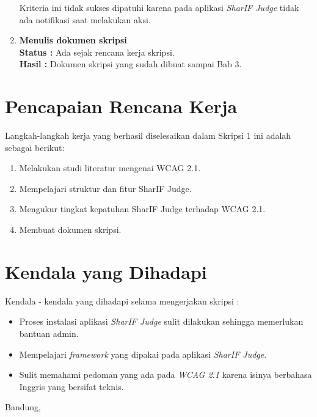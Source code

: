 \documentclass[a4paper,twoside]{article}
\begin{document}
\begin{enumerate}
		Kriteria ini tidak sukses dipatuhi karena pada aplikasi \textit{SharIF Judge} tidak ada notifikasi saat melakukan aksi.

		\item \textbf{Menulis dokumen skripsi}\\
		{\bf Status :} Ada sejak rencana kerja skripsi.\\
		{\bf Hasil :} Dokumen skripsi yang sudah dibuat sampai Bab 3.

	\end{enumerate}

\section{Pencapaian Rencana Kerja}
Langkah-langkah kerja yang berhasil diselesaikan dalam Skripsi 1 ini adalah sebagai berikut:
\begin{enumerate}
\item Melakukan studi literatur mengenai WCAG 2.1.
\item Mempelajari struktur dan fitur SharIF Judge.
\item Mengukur tingkat kepatuhan SharIF Judge terhadap WCAG 2.1.
\item Membuat dokumen skripsi.
\end{enumerate}



\section{Kendala yang Dihadapi}
Kendala - kendala yang dihadapi selama mengerjakan skripsi :
\begin{itemize}
	\item Proses instalasi aplikasi \textit{SharIF Judge} sulit dilakukan sehingga memerlukan bantuan admin.
	\item Mempelajari \textit{framework} yang dipakai pada aplikasi \textit{SharIF Judge}.
	\item Sulit memahami pedoman yang ada pada \textit{WCAG 2.1} karena isinya berbahasa Inggris yang bersifat teknis.
\end{itemize}

\vspace{1cm}
\centering Bandung, \tanggal\\
\vspace{2cm} \nama \\ 
\vspace{1cm}
\end{document}
